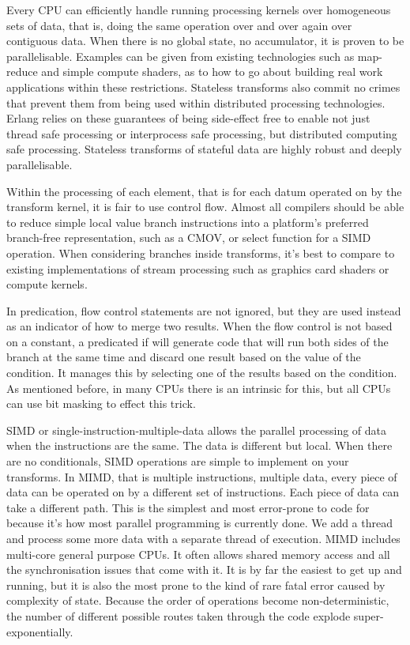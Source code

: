 \documentclass[a4paper,12pt]{article}
\begin{document}
Every CPU can efficiently handle running processing kernels over homogeneous sets of data, that is, doing the same operation over and over again over contiguous data.
When there is no global state, no accumulator, it is proven to be parallelisable.
Examples can be given from existing technologies such as map-reduce and simple compute shaders, as to how to go about building real work applications within these restrictions.
Stateless transforms also commit no crimes that prevent them from being used within distributed processing technologies.
Erlang relies on these guarantees of being side-effect free to enable not just thread safe processing or interprocess safe processing, but distributed computing safe processing.
Stateless transforms of stateful data are highly robust and deeply parallelisable.

Within the processing of each element, that is for each datum operated on by the transform kernel, it is fair to use control flow.
Almost all compilers should be able to reduce simple local value branch instructions into a platform's preferred branch-free representation, such as a CMOV, or select function for a SIMD operation.
When considering branches inside transforms, it's best to compare to existing implementations of stream processing such as graphics card shaders or compute kernels.

In predication, flow control statements are not ignored, but they are used instead as an indicator of how to merge two results.
When the flow control is not based on a constant, a predicated if will generate code that will run both sides of the branch at the same time and discard one result based on the value of the condition.
It manages this by selecting one of the results based on the condition.
As mentioned before, in many CPUs there is an intrinsic for this, but all CPUs can use bit masking to effect this trick.

SIMD or single-instruction-multiple-data allows the parallel processing of data when the instructions are the same.
The data is different but local.
When there are no conditionals, SIMD operations are simple to implement on your transforms.
In MIMD, that is multiple instructions, multiple data, every piece of data can be operated on by a different set of instructions.
Each piece of data can take a different path.
This is the simplest and most error-prone to code for because it's how most parallel programming is currently done.
We add a thread and process some more data with a separate thread of execution.
MIMD includes multi-core general purpose CPUs.
It often allows shared memory access and all the synchronisation issues that come with it.
It is by far the easiest to get up and running, but it is also the most prone to the kind of rare fatal error caused by complexity of state.
Because the order of operations become non-deterministic, the number of different possible routes taken through the code explode super-exponentially.
\end{document}
